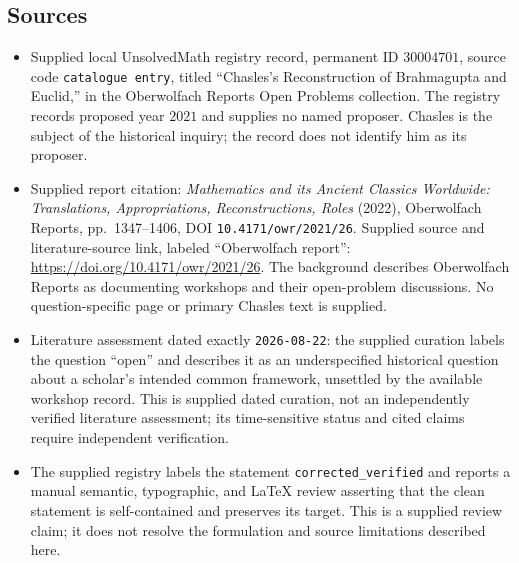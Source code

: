 \documentclass[11pt]{article}
\begin{document}
\subsection{Sources}
\begin{itemize}
\item Supplied local UnsolvedMath registry record, permanent ID \(30004701\), source code \texttt{catalogue entry}, titled ``Chasles's Reconstruction of Brahmagupta and Euclid,'' in the Oberwolfach Reports Open Problems collection. The registry records proposed year \(2021\) and supplies no named proposer. Chasles is the subject of the historical inquiry; the record does not identify him as its proposer.
\item Supplied report citation: \emph{Mathematics and its Ancient Classics Worldwide: Translations, Appropriations, Reconstructions, Roles} (2022), Oberwolfach Reports, pp.~1347--1406, DOI \texttt{10.4171/owr/2021/26}. Supplied source and literature-source link, labeled ``Oberwolfach report'': \url{https://doi.org/10.4171/owr/2021/26}. The background describes Oberwolfach Reports as documenting workshops and their open-problem discussions. No question-specific page or primary Chasles text is supplied.
\item Literature assessment dated exactly \texttt{2026-08-22}: the supplied curation labels the question ``open'' and describes it as an underspecified historical question about a scholar's intended common framework, unsettled by the available workshop record. This is supplied dated curation, not an independently verified literature assessment; its time-sensitive status and cited claims require independent verification.
\item The supplied registry labels the statement \texttt{corrected\_verified} and reports a manual semantic, typographic, and LaTeX review asserting that the clean statement is self-contained and preserves its target. This is a supplied review claim; it does not resolve the formulation and source limitations described here.
\end{itemize}
\end{document}
